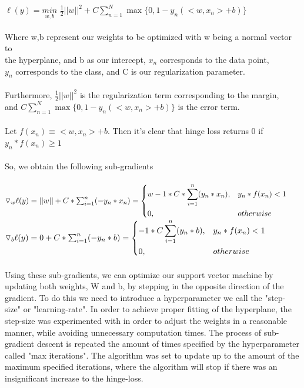 \documentclass[12pt]{article}%
\begin{document}
	$\ell(y)=\underset{w,b}{min}$ $\frac{1}{2}||w||^2 + C\sum_{n=1}^{N}\max\{0,1-y_n(<w,x_n>+b)\}$\\\\
	\indent Where w,b represent our weights to be optimized with w being a normal vector to\\\indent the hyperplane, and b as our intercept, $x_n$ corresponds to the data point, \\\indent$y_n$ corresponds to the class, and C is our regularization parameter.\\\\\indent
	Furthermore, $\frac{1}{2}||w||^2$ is the regularization term corresponding to the margin,\\\indent and $C\sum_{n=1}^{N}\max\{0,1-y_n(<w,x_n>+b)\}$ is the error term.\\\\\indent
	Let $f(x_n)\equiv<w,x_n>+b$.
	Then it's clear that hinge loss returns 0 if $y_n * f(x_n) \geq 1$\\\\
	\noindent
	So, we obtain the following sub-gradients\\\\\indent
	$\triangledown_w\ell(y)=||w|| + C * \sum_{i=1}^{n}(-y_n * x_n)=
	\begin{dcases}
	w -1 * C*\sum_{i=1}^{n}(y_n*x_n), & y_n * f(x_n) < 1\\
	0, & otherwise \\
	\end{dcases}
	\\\indent$
	$\triangledown_b\ell(y)=0+C*\sum_{i=1}^{n}(-y_n*b)=		\begin{dcases}
	-1 * C\sum_{i=1}^{n}(y_n*b), & y_n * f(x_n) < 1\\
	0, & otherwise \\
	\end{dcases}$
	\\\\\noindent
	Using these sub-gradients, we can optimize our support vector machine by updating both weights, W and b, by stepping in the opposite direction of the gradient.  To do this we need to introduce a hyperparameter we call the "step-size" or "learning-rate".  In order to achieve proper fitting of the hyperplane, the step-size was experimented with in order to adjust the weights in a reasonable manner, while avoiding unnecessary computation times.  The process of sub-gradient descent is repeated the amount of times specified by the hyperparameter called "max iterations".  The algorithm was set to update up to the amount of the maximum specified iterations, where the algorithm will stop if there was an insignificant increase to the hinge-loss. 
	
\end{document}
